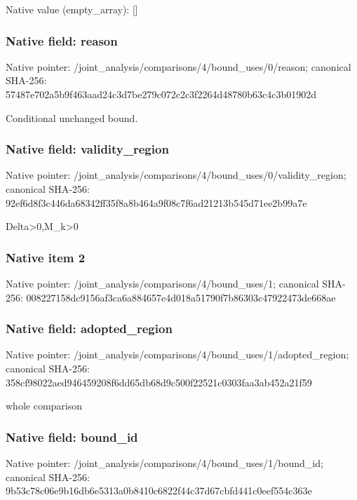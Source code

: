 \documentclass[10pt,a4paper]{article}
\begin{document}
Native value (empty\_\allowbreak{}array): []

\subsubsection{Native field: reason}
Native pointer: /joint\_\allowbreak{}analysis/comparisons/4/bound\_\allowbreak{}uses/0/reason; canonical SHA-256: 57487e702a5b9f463aad24c3d7be279c072c2c3f2264d48780b63c4c3b01902d

\begingroup\raggedright\sloppy Conditional unchanged bound.\par\endgroup

\subsubsection{Native field: validity\_\allowbreak{}region}
Native pointer: /joint\_\allowbreak{}analysis/comparisons/4/bound\_\allowbreak{}uses/0/validity\_\allowbreak{}region; canonical SHA-256: 92ef6d8f3c446da68342ff35f8a8b464a9f08c7f6ad21213b545d71ee2b99a7e

\begingroup\raggedright\sloppy Delta>0,\allowbreak{}M\_\allowbreak{}k>0\par\endgroup

\subsubsection{Native item 2}
Native pointer: /joint\_\allowbreak{}analysis/comparisons/4/bound\_\allowbreak{}uses/1; canonical SHA-256: 008227158dc9156af3ca6a884657e4d018a51790f7b86303c47922473de668ae

\subsubsection{Native field: adopted\_\allowbreak{}region}
Native pointer: /joint\_\allowbreak{}analysis/comparisons/4/bound\_\allowbreak{}uses/1/adopted\_\allowbreak{}region; canonical SHA-256: 358cf98022aed946459208f6dd65db68d9c500f22521c0303faa3ab452a21f59

\begingroup\raggedright\sloppy whole comparison\par\endgroup

\subsubsection{Native field: bound\_\allowbreak{}id}
Native pointer: /joint\_\allowbreak{}analysis/comparisons/4/bound\_\allowbreak{}uses/1/bound\_\allowbreak{}id; canonical SHA-256: 9b53c78c06e9b16db6e5313a0b8410c6822f44c37d67cbfd441c0eef554c363e
\end{document}

